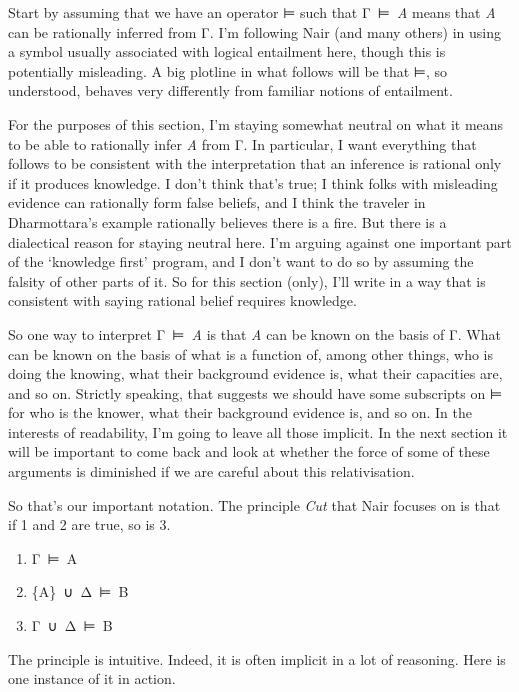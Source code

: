 \documentclass[
  12pt,
  letterpaper,
]{scrbook}
\providecommand{\tightlist}{%
  \setlength{\itemsep}{0pt}\setlength{\parskip}{0pt}}\usepackage{longtable,booktabs,array}
\begin{document}
Start by assuming that we have an operator ⊨ such that Γ~⊨~\emph{A}
means that \emph{A} can be rationally inferred from Γ. I'm following
Nair (and many others) in using a symbol usually associated with logical
entailment here, though this is potentially misleading. A big plotline
in what follows will be that ⊨, so understood, behaves very differently
from familiar notions of entailment.

For the purposes of this section, I'm staying somewhat neutral on what
it means to be able to rationally infer \emph{A} from Γ. In particular,
I want everything that follows to be consistent with the interpretation
that an inference is rational only if it produces knowledge. I don't
think that's true; I think folks with misleading evidence can rationally
form false beliefs, and I think the traveler in Dharmottara's example
rationally believes there is a fire. But there is a dialectical reason
for staying neutral here. I'm arguing against one important part of the
`knowledge first' program, and I don't want to do so by assuming the
falsity of other parts of it. So for this section (only), I'll write in
a way that is consistent with saying rational belief requires knowledge.

So one way to interpret Γ~⊨~\emph{A} is that \emph{A} can be known on
the basis of Γ. What can be known on the basis of what is a function of,
among other things, who is doing the knowing, what their background
evidence is, what their capacities are, and so on. Strictly speaking,
that suggests we should have some subscripts on ⊨ for who is the knower,
what their background evidence is, and so on. In the interests of
readability, I'm going to leave all those implicit. In the next section
it will be important to come back and look at whether the force of some
of these arguments is diminished if we are careful about this
relativisation.

So that's our important notation. The principle \emph{Cut} that Nair
focuses on is that if 1 and 2 are true, so is 3.

\begin{enumerate}
\def\labelenumi{\arabic{enumi}.}
\tightlist
\item
  Γ~⊨~A
\item
  \{A\}~∪~Δ~⊨~B
\item
  Γ~∪~Δ~⊨~B
\end{enumerate}

The principle is intuitive. Indeed, it is often implicit in a lot of
reasoning. Here is one instance of it in action.
\end{document}
